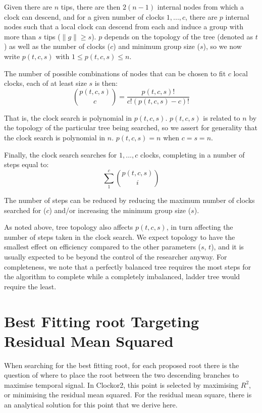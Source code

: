 \documentclass{article}
\begin{document}
Given there are $n$ tips, there are then $2(n-1)$ internal nodes from which a clock can descend, and for a given number of clocks $1,...,c$, there are $p$ internal nodes such that a local clock can descend from each and induce a group with more than $s$ tips ($\|g\| \ge s$). $p$ depends on the topology of the tree (denoted as $t$) as well as the number of clocks ($c$) and minimum group size ($s$), so we now write $p(t,c,s)$ with $1 \le p(t,c,s) \le n$.

The number of possible combinations of nodes that can be chosen to fit $c$ local clocks, each of at least size $s$ is then:
\begin{equation}
    \binom{p(t,c,s)}{c} = \frac{p(t,c,s)!}{c!(p(t,c,s)-c)!}
\end{equation}

That is, the clock search is polynomial in $p(t,c,s)$. $p(t,c,s)$ is related to $n$ by the topology of the particular tree being searched, so we assert for generality that the clock search is polynomial in $n$. $p(t,c,s) = n$ when $c = s = n$.

Finally, the clock search searches for $1,...,c$ clocks, completing in a number of steps equal to:
\begin{equation}
    \sum_{1}^{c} \binom{p(t,c,s)}{i}
\end{equation}

The number of steps can be reduced by reducing the maximum number of clocks searched for ($c$) and/or increasing the minimum group size ($s$).

As noted above, tree topology also affects $p(t,c,s)$, in turn affecting the number of steps taken in the clock search. We expect topology to have the smallest effect on efficiency compared to the other parameters ($s$, $t$), and it is usually expected to be beyond the control of the researcher anyway. For completeness, we note that a perfectly balanced tree requires the most steps for the algorithm to complete while a completely imbalanced, ladder tree would require the least.

\section{Best Fitting root Targeting Residual Mean Squared}
When searching for the best fitting root, for each proposed root there is the question of where to place the root between the two descending branches to maximise temporal signal. In Clockor2, this point is selected by maximising $R^2$, or minimising the residual mean squared. For the residual mean square, there is an analytical solution for this point that we derive here.
\end{document}
